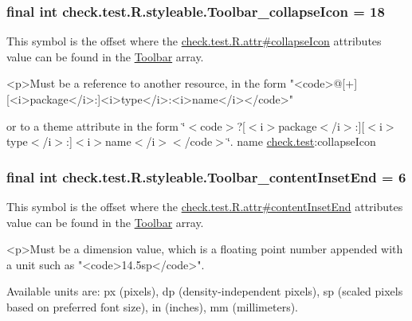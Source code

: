\subsubsection[{Toolbar\+\_\+collapse\+Icon}]{\setlength{\rightskip}{0pt plus 5cm}final int check.\+test.\+R.\+styleable.\+Toolbar\+\_\+collapse\+Icon = 18\hspace{0.3cm}{\ttfamily [static]}}\label{classcheck_1_1test_1_1_r_1_1styleable_a768d406fdf51c661de7d2c032a071146}
This symbol is the offset where the \hyperlink{classcheck_1_1test_1_1_r_1_1attr_ae765bc74d7af7856f471f981ff65d849}{check.\+test.\+R.\+attr\#collapse\+Icon} attribute\textquotesingle{}s value can be found in the \hyperlink{classcheck_1_1test_1_1_r_1_1styleable_a1a7fa90223693abef77e7484cca2df54}{Toolbar} array.

\begin{DoxyVerb}      <p>Must be a reference to another resource, in the form "<code>@[+][<i>package</i>:]<i>type</i>:<i>name</i></code>"
\end{DoxyVerb}
 or to a theme attribute in the form \char`\"{}$<$code$>$?\mbox{[}$<$i$>$package$<$/i$>$\+:\mbox{]}\mbox{[}$<$i$>$type$<$/i$>$\+:\mbox{]}$<$i$>$name$<$/i$>$$<$/code$>$\char`\"{}.  name \hyperlink{namespacecheck_1_1test}{check.\+test}\+:collapse\+Icon \hypertarget{classcheck_1_1test_1_1_r_1_1styleable_a2dfa579a4e4d1b7daec868e5ef8667f9}{}
\subsubsection[{Toolbar\+\_\+content\+Inset\+End}]{\setlength{\rightskip}{0pt plus 5cm}final int check.\+test.\+R.\+styleable.\+Toolbar\+\_\+content\+Inset\+End = 6\hspace{0.3cm}{\ttfamily [static]}}\label{classcheck_1_1test_1_1_r_1_1styleable_a2dfa579a4e4d1b7daec868e5ef8667f9}
This symbol is the offset where the \hyperlink{classcheck_1_1test_1_1_r_1_1attr_ae54701e7140ba2c59574741d9e6cde46}{check.\+test.\+R.\+attr\#content\+Inset\+End} attribute\textquotesingle{}s value can be found in the \hyperlink{classcheck_1_1test_1_1_r_1_1styleable_a1a7fa90223693abef77e7484cca2df54}{Toolbar} array.

\begin{DoxyVerb}      <p>Must be a dimension value, which is a floating point number appended with a unit such as "<code>14.5sp</code>".
\end{DoxyVerb}
 Available units are\+: px (pixels), dp (density-\/independent pixels), sp (scaled pixels based on preferred font size), in (inches), mm (millimeters). 

